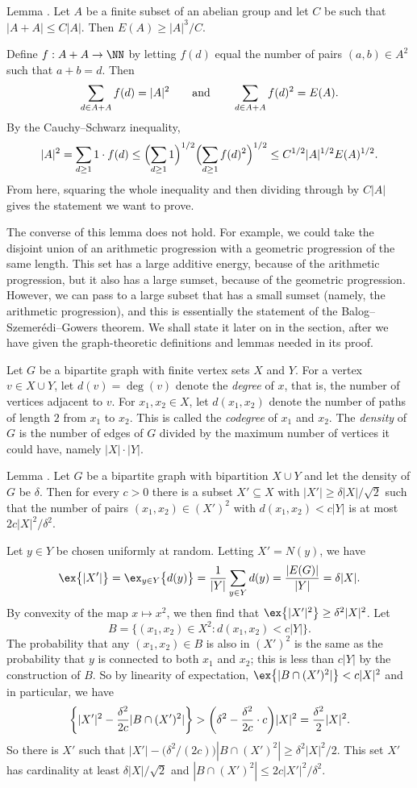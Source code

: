 \proclaim Lemma {\advthm}. Let $A$ be a finite subset of an abelian group and let $C$ be such
that $|A+A|\le C|A|$. Then $E(A)\ge |A|^3/C$.

\proof Define $f : A+A\to \NN$ by letting $f(d)$ equal the number of pairs $(a,b)\in A^2$ such
that $a+b =d$. Then
$$\sum_{d\in A+A} f(d) = |A|^2\qquad\hbox{and}\qquad \sum_{d\in A+A} f(d)^2 = E(A).$$
By the Cauchy--Schwarz inequality,
$$|A|^2 = \sum_{d\ge 1} 1\cdot f(d)
\le \Bigl(\sum_{d\ge 1} 1\Bigr)^{1/2} \Bigl( \sum_{d\ge 1} f(d)^2\Bigr)^{1/2}
\le C^{1/2} |A|^{1/2} E(A)^{1/2}.$$
From here, squaring the whole inequality and then dividing through by $C|A|$ gives the statement
we want to prove.\slug

The converse of this lemma does not hold. For example, we could take the disjoint
union of an arithmetic progression with a geometric progression of the same length.
This set has a large additive energy,
because of the arithmetic progression, but it also has a large sumset, because of the geometric progression.
However, we can pass to a large subset that has a small sumset (namely, the arithmetic progression), and this
is essentially the statement of the Balog--Szemer\'edi--Gowers theorem. We shall state it later on in the
section, after we have given the graph-theoretic definitions and lemmas needed in its proof.

Let $G$ be a bipartite graph with finite vertex sets $X$ and $Y$. For a vertex $v\in X\cup Y$,
let $d(v) = \deg(v)$ denote the {\it degree} of $x$, that is, the number of vertices adjacent to $v$.
For $x_1,x_2\in X$, let $d(x_1,x_2)$ denote the number of paths of length $2$ from $x_1$ to $x_2$. This
is called the {\it codegree} of $x_1$ and $x_2$. The {\it density} of $G$ is the number of edges of $G$
divided by the maximum number of vertices it could have, namely $|X|\cdot|Y|$.

\proclaim Lemma {\advthm}. Let $G$ be a bipartite graph with bipartition $X\cup Y$ and let the density
of $G$ be $\delta$. Then for every $c>0$ there is a subset $X'\subseteq X$ with $|X'|\ge \delta|X|/\sqrt 2$
such that the number of pairs $(x_1,x_2)\in (X')^2$ with $d(x_1,x_2) < c|Y|$ is at most $2c|X|^2/\delta^2$.

\proof Let $y\in Y$ be chosen uniformly at random. Letting $X' = N(y)$, we have
$$\ex\bigl\{ |X'|\bigr\} = \ex_{y\in Y} \bigl\{ d(y)\bigr\} = {1\over |Y|} \sum_{y\in Y} d(y)
= {|E(G)|\over |Y|} = \delta|X|.$$
By convexity of the map $x\mapsto x^2$, we then find that $\ex\bigl\{ |X'|^2\bigr\} \ge \delta^2|X|^2$.
Let
$$B = \bigl\{ (x_1,x_2)\in X^2 : d(x_1,x_2) < c|Y|\bigr\}.$$
The probability that any $(x_1, x_2)\in B$ is also in $(X')^2$ is the same as the probability that
$y$ is connected to both $x_1$ and $x_2$; this is less than $c|Y|$ by the construction of $B$.
So by linearity of expectation, $\ex\bigl\{ |B\cap (X')^2| \bigr\} < c|X|^2$ and in particular, we
have
$$\biggl\{ |X'|^2 - {\delta^2\over 2c} |B\cap(X')^2|\biggr\}
 >\biggl(\delta^2 - {\delta^2\over 2c}\cdot c\biggr)|X|^2 = {\delta^2\over 2}|X|^2.$$
So there is $X'$ such that $|X'| - \bigl(\delta^2/(2c)\bigr) |B\cap (X')^2| \ge \delta^2|X|^2/2$.
This set $X'$ has cardinality at least $\delta |X|/\sqrt 2$ and $|B\cap (X')^2| \le 2c|X'|^2/\delta^2$.\slug

